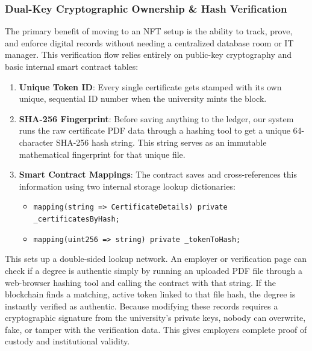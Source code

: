 \subsubsection{Dual-Key Cryptographic Ownership \& Hash Verification}

The primary benefit of moving to an NFT setup is the ability to track, prove, and enforce digital records without needing a centralized database room or IT manager\cite{wood2008EthereumYellowPaper}. This verification flow relies entirely on public-key cryptography and basic internal smart contract tables\cite{wood2008EthereumYellowPaper}\cite{natinalIntitute2015fips}:

\begin{enumerate}
    \item \textbf{Unique Token ID}: Every single certificate gets stamped with its own unique, sequential ID number when the university mints the block\cite{william2018eip721}.

    \item \textbf{SHA-256 Fingerprint}: Before saving anything to the ledger, our system runs the raw certificate PDF data through a hashing tool to get a unique 64-character SHA-256 hash string\cite{natinalIntitute2015fips}. This string serves as an immutable mathematical fingerprint for that unique file\cite{natinalIntitute2015fips}\cite{ahsan2025shikkachain}.

    \item \textbf{Smart Contract Mappings}: The contract saves and cross-references this information using two internal storage lookup dictionaries\cite{wood2008EthereumYellowPaper}\cite{openzeppelin2026erc721}:
          \begin{itemize}
              \item \texttt{mapping(string => CertificateDetails) private \_certificatesByHash;}
              \item \texttt{mapping(uint256 => string) private \_tokenToHash;}
          \end{itemize}
\end{enumerate}

This sets up a double-sided lookup network. An employer or verification page can check if a degree is authentic simply by running an uploaded PDF file through a web-browser hashing tool\cite{w3c2025webcrypto} and calling the contract with that string\cite{ether2026ether}. If the blockchain finds a matching, active token linked to that file hash, the degree is instantly verified as authentic\cite{ahsan2025shikkachain}. Because modifying these records requires a cryptographic signature from the university’s private keys, nobody can overwrite, fake, or tamper with the verification data\cite{wood2008EthereumYellowPaper}\cite{ahsan2025shikkachain}. This gives employers complete proof of custody and institutional validity\cite{william2018eip721}\cite{ahsan2025shikkachain}.